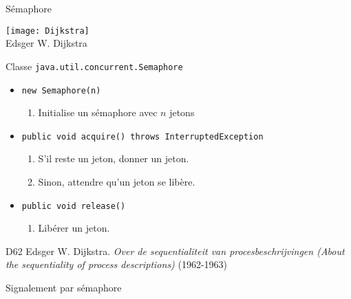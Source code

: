 \begin{frame}{Sémaphore}
  \begin{center}
    \texttt{[image: Dijkstra]}\\
    Edsger W. Dijkstra
  \end{center}
  \vFill
  \begin{block}{Classe \lstinline{java.util.concurrent.Semaphore}}
      \begin{itemize}
      \item \lstinline{new Semaphore(n)}
	\begin{enumerate}
	\item Initialise un sémaphore avec $n$ jetons
	\end{enumerate}
      \item \lstinline{public void acquire() throws InterruptedException}
	\begin{enumerate}
	\item S'il reste un jeton, donner un jeton.
	\item Sinon, attendre qu'un jeton se libère.
	\end{enumerate}
      \item \lstinline{public void release()}
	\begin{enumerate}
	\item Libérer un jeton.
	\end{enumerate}
      \end{itemize}
  \end{block}
  \vFill
  \begin{citing}
  \item[D62] Edsger W. Dijkstra. \textit{Over de sequentialiteit van procesbeschrijvingen (About the sequentiality of process descriptions)} (1962-1963)
  \end{citing}
\end{frame}


\begin{frame}[fragile]{Signalement par sémaphore}
\end{frame}

